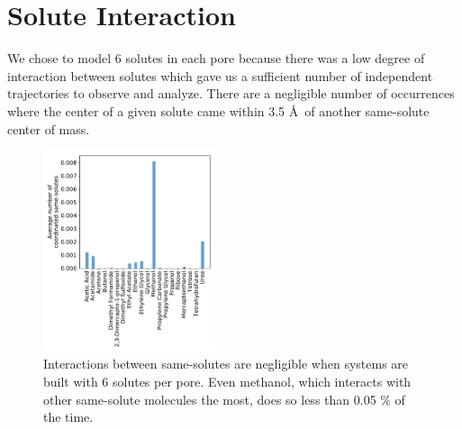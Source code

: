 \documentclass{article}
\begin{document}
  \clearpage  
  
  \section{Solute Interaction}\label{section:solute_interaction}
  
  We chose to model 6 solutes in each pore because there was a low degree of 
  interaction between solutes which gave us a sufficient number of independent 
  trajectories to observe and analyze. There are a negligible number of occurrences
  where the center of a given solute came within 3.5 \AA~of another same-solute
  center of mass.
  
  \begin{figure}[!htb]
  \centering
  \includegraphics[width=0.45\textwidth]{solute_interaction.pdf}
  \caption{Interactions between same-solutes are negligible when systems are 
  built with 6 solutes per pore. Even methanol, which interacts with other same-solute
  molecules the most, does so less than 0.05 \% of the time.}\label{fig:solute_interaction}
  \end{figure}
  
\end{document}
